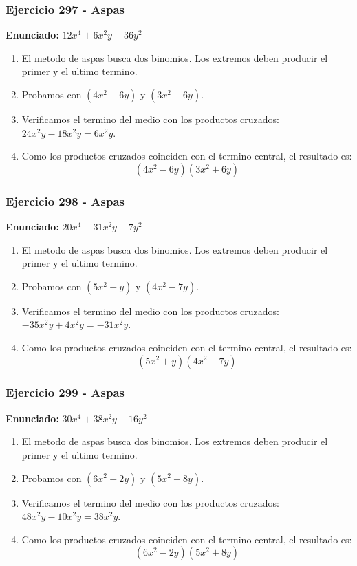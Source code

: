 \documentclass[11pt,a4paper]{article}
\begin{document}
\vspace{0.2cm}
\subsubsection*{Ejercicio 297 - Aspas}
\textbf{Enunciado:} $ 12 x^{4} + 6 x^{2} y - 36 y^{2} $\par
\begin{enumerate}[leftmargin=2em]
\item El metodo de aspas busca dos binomios. Los extremos deben producir el primer y el ultimo termino.
\item Probamos con \((4 x^{2} - 6 y)\) y \((3 x^{2} + 6 y)\).
\item Verificamos el termino del medio con los productos cruzados: \(24 x^{2} y- 18 x^{2} y=6 x^{2} y\).
\item Como los productos cruzados coinciden con el termino central, el resultado es: \[\boxed{\left(4 x^{2} - 6 y\right)\left(3 x^{2} + 6 y\right)}\]
\end{enumerate}

\vspace{0.2cm}
\subsubsection*{Ejercicio 298 - Aspas}
\textbf{Enunciado:} $ 20 x^{4} - 31 x^{2} y - 7 y^{2} $\par
\begin{enumerate}[leftmargin=2em]
\item El metodo de aspas busca dos binomios. Los extremos deben producir el primer y el ultimo termino.
\item Probamos con \((5 x^{2} + y)\) y \((4 x^{2} - 7 y)\).
\item Verificamos el termino del medio con los productos cruzados: \(- 35 x^{2} y+4 x^{2} y=- 31 x^{2} y\).
\item Como los productos cruzados coinciden con el termino central, el resultado es: \[\boxed{\left(5 x^{2} + y\right)\left(4 x^{2} - 7 y\right)}\]
\end{enumerate}

\vspace{0.2cm}
\subsubsection*{Ejercicio 299 - Aspas}
\textbf{Enunciado:} $ 30 x^{4} + 38 x^{2} y - 16 y^{2} $\par
\begin{enumerate}[leftmargin=2em]
\item El metodo de aspas busca dos binomios. Los extremos deben producir el primer y el ultimo termino.
\item Probamos con \((6 x^{2} - 2 y)\) y \((5 x^{2} + 8 y)\).
\item Verificamos el termino del medio con los productos cruzados: \(48 x^{2} y- 10 x^{2} y=38 x^{2} y\).
\item Como los productos cruzados coinciden con el termino central, el resultado es: \[\boxed{\left(6 x^{2} - 2 y\right)\left(5 x^{2} + 8 y\right)}\]
\end{enumerate}
\end{document}
